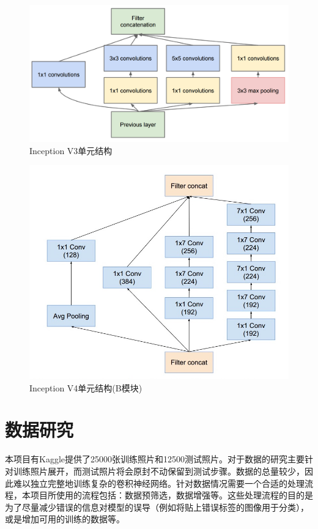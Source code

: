 \documentclass[a4paper,11pt]{article}
\begin{document}
 \begin{figure}[htb]
\centering
\includegraphics[scale=0.2]{./figure/inception_v3.png}
\caption{Inception V3单元结构}
\label{fig:inceptionV3}
\end{figure}

 \begin{figure}[htb]
\centering
\includegraphics[scale=0.4]{./figure/inception_v4.jpg}
\caption{Inception V4单元结构(B模块)}
\label{fig:inceptionV4}
\end{figure}


\section{数据研究}
\label{sec:org544440e}
本项目有Kaggle提供了25000张训练照片和12500测试照片。对于数据的研究主要针对训练照片展开，而测试照片将会原封不动保留到测试步骤。数据的总量较少，因此难以独立完整地训练复杂的卷积神经网络。针对数据情况需要一个合适的处理流程，本项目所使用的流程包括：数据预筛选，数据增强等。这些处理流程的目的是为了尽量减少错误的信息对模型的误导（例如将贴上错误标签的图像用于分类），或是增加可用的训练的数据等。
\end{document}
